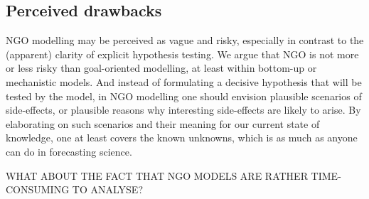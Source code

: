 \subsection{Perceived drawbacks}

NGO modelling may be perceived as vague and risky, especially in contrast to the (apparent) clarity of explicit hypothesis testing. We argue that NGO is not more or less risky than goal-oriented modelling, at least within bottom-up or mechanistic models. And instead of formulating a decisive hypothesis that will be tested by the model, in NGO modelling one should envision plausible scenarios of side-effects, or plausible reasons why interesting side-effects are likely to arise. By elaborating on such scenarios and their meaning for our current state of knowledge, one at least covers the known unknowns, which is as much as anyone can do in forecasting science.

WHAT ABOUT THE FACT THAT NGO MODELS ARE RATHER TIME-CONSUMING TO ANALYSE?
